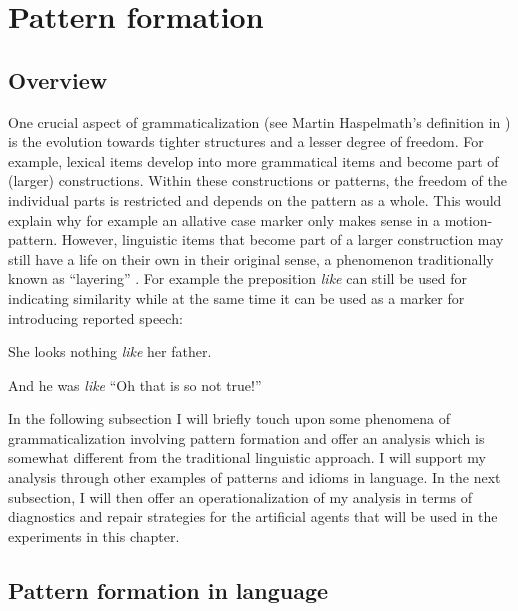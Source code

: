 \section{Pattern formation}
\label{s:pattern-formation}

\subsection{Overview}
One crucial aspect of grammaticalization (see Martin Haspelmath's definition in ) is the evolution towards tighter structures and a lesser degree of freedom. For example, lexical items develop into more grammatical items and become part of (larger) constructions. Within these constructions or patterns, the freedom of the individual parts is restricted and depends on the pattern as a whole. This would explain why for example an allative case marker only makes sense in a motion-pattern. However, linguistic items that become part of a larger construction may still have a life on their own in their original sense, a phenomenon traditionally known as ``layering'' \citep[124--126]{hopper93grammaticalization}. For example the preposition {\em like} can still be used for indicating similarity while at the same time it can be used as a marker for introducing reported speech:

\ea
She looks nothing {\em like} her father.
\item And he was {\em like} ``Oh that is so not true!''
\z

In the following subsection I will briefly touch upon some phenomena of grammaticalization involving pattern formation and offer an analysis which is somewhat different from the traditional linguistic approach. I will support my analysis through other examples of patterns and idioms in language. In the next subsection, I will then offer an operationalization of my analysis in terms of diagnostics and repair strategies for the artificial agents that will be used in the experiments in this chapter.



\subsection{Pattern formation in language}


